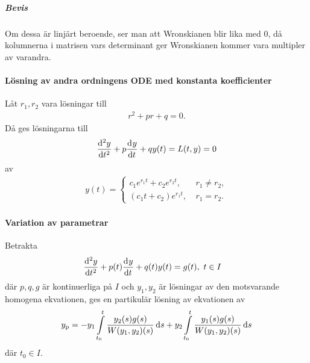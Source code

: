\subparagraph{Bevis}
Om dessa är linjärt beroende, ser man att Wronskianen blir lika med $0$, då kolumnerna i matrisen vars determinant ger Wronskianen kommer vara multipler av varandra.

\paragraph{Lösning av andra ordningens ODE med konstanta koefficienter}
Låt $r_1, r_2$ vara lösningar till
\begin{align*}
	r^2 + pr + q = 0.
\end{align*}
Då ges lösningarna till
\begin{align*}
	\dv[2]{y}{t} (t) + p\dv[]{y}{t} (t) + qy(t) = L(t, y) = 0
\end{align*}
av
\begin{align*}
	y(t) = 
	\begin{cases}
		c_1e^{r_1t} + c_2e^{r_2t},\ &r_1\neq r_2, \\
		(c_1t + c_2)e^{r_1t},\      &r_1 = r_2.
	\end{cases}
\end{align*}

\paragraph{Variation av parametrar}
Betrakta
\begin{align*}
	\deval[2]{y}{t}{t} + p(t)\deval{y}{t}{t} + q(t)y(t) &= g(t),\ t\in I
\end{align*}
där $p, q, g$ är kontinuerliga på $I$ och $y_{1}, y_{2}$ är lösningar av den motsvarande homogena ekvationen, ges en partikulär lösning av ekvationen av
\begin{align*}
	y_{\text{p}} = -y_{1}\int\limits_{t_{0}}^{t}\frac{y_{2}(s)g(s)}{W(y_{1}, y_{2})(s)}\dd{s} + y_{2}\int\limits_{t_{0}}^{t}\frac{y_{1}(s)g(s)}{W(y_{1}, y_{2})(s)}\dd{s}
\end{align*}
där $t_{0}\in I$.
